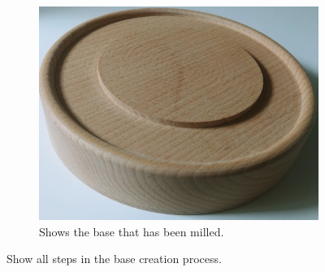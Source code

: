 \documentclass[04.3_buildingProcess.tex]{subfiles}
\begin{document}
\begin{flushleft}
\begin{figure}[H]
\begin{subfigure}{.45\textwidth}
                \includegraphics[scale=0.05]{images/materialProcess/base.jpg}
                \caption{Shows the base that has been milled.}
                \label{fig:blossomBase}
                \vspace{6mm}
            \end{subfigure}
            \caption{Show all steps in the base creation process.}
            \label{fig:laserCutTests}
        \end{figure}
    \end{flushleft}
\end{document}
